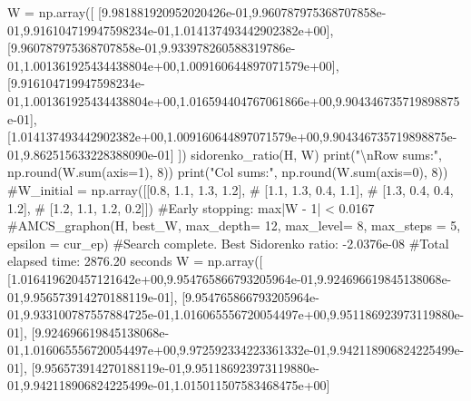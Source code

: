 \documentclass[
  letterpaper,
  DIV=11,
  numbers=noendperiod]{scrartcl}
\newenvironment{Shaded}{\begin{snugshade}}{\end{snugshade}}
\newcommand{\BuiltInTok}[1]{\textcolor[rgb]{0.00,0.23,0.31}{#1}}
\newcommand{\CharTok}[1]{\textcolor[rgb]{0.13,0.47,0.30}{#1}}
\newcommand{\CommentTok}[1]{\textcolor[rgb]{0.37,0.37,0.37}{#1}}
\newcommand{\DecValTok}[1]{\textcolor[rgb]{0.68,0.00,0.00}{#1}}
\newcommand{\FloatTok}[1]{\textcolor[rgb]{0.68,0.00,0.00}{#1}}
\newcommand{\NormalTok}[1]{\textcolor[rgb]{0.00,0.23,0.31}{#1}}
\newcommand{\OperatorTok}[1]{\textcolor[rgb]{0.37,0.37,0.37}{#1}}
\newcommand{\StringTok}[1]{\textcolor[rgb]{0.13,0.47,0.30}{#1}}
\begin{document}
\begin{Shaded}
\begin{Highlighting}[]
\NormalTok{W }\OperatorTok{=}\NormalTok{ np.array([}
\NormalTok{  [}\FloatTok{9.981881920952020426e{-}01}\NormalTok{,}\FloatTok{9.960787975368707858e{-}01}\NormalTok{,}\FloatTok{9.916104719947598234e{-}01}\NormalTok{,}\FloatTok{1.014137493442902382e+00}\NormalTok{],}
\NormalTok{[}\FloatTok{9.960787975368707858e{-}01}\NormalTok{,}\FloatTok{9.933978260588319786e{-}01}\NormalTok{,}\FloatTok{1.001361925434438804e+00}\NormalTok{,}\FloatTok{1.009160644897071579e+00}\NormalTok{],}
\NormalTok{[}\FloatTok{9.916104719947598234e{-}01}\NormalTok{,}\FloatTok{1.001361925434438804e+00}\NormalTok{,}\FloatTok{1.016594404767061866e+00}\NormalTok{,}\FloatTok{9.904346735719898875e{-}01}\NormalTok{],}
\NormalTok{[}\FloatTok{1.014137493442902382e+00}\NormalTok{,}\FloatTok{1.009160644897071579e+00}\NormalTok{,}\FloatTok{9.904346735719898875e{-}01}\NormalTok{,}\FloatTok{9.862515633228388090e{-}01}\NormalTok{]}
\NormalTok{])}
\NormalTok{sidorenko\_ratio(H, W)}
\BuiltInTok{print}\NormalTok{(}\StringTok{"}\CharTok{\textbackslash{}n}\StringTok{Row sums:"}\NormalTok{, np.}\BuiltInTok{round}\NormalTok{(W.}\BuiltInTok{sum}\NormalTok{(axis}\OperatorTok{=}\DecValTok{1}\NormalTok{), }\DecValTok{8}\NormalTok{))}
\BuiltInTok{print}\NormalTok{(}\StringTok{"Col sums:"}\NormalTok{, np.}\BuiltInTok{round}\NormalTok{(W.}\BuiltInTok{sum}\NormalTok{(axis}\OperatorTok{=}\DecValTok{0}\NormalTok{), }\DecValTok{8}\NormalTok{))}
\CommentTok{\#W\_initial = np.array([[0.8, 1.1, 1.3, 1.2],}
   \CommentTok{\# [1.1, 1.3, 0.4, 1.1],}
  \CommentTok{\#  [1.3, 0.4, 0.4, 1.2],}
  \CommentTok{\#  [1.2, 1.1, 1.2, 0.2]])}
\CommentTok{\#Early stopping: max|W {-} 1| \textless{} 0.0167}
\CommentTok{\#AMCS\_graphon(H, best\_W, max\_depth= 12, max\_level= 8, max\_steps = 5, epsilon = cur\_ep)}
\CommentTok{\#Search complete. Best Sidorenko ratio: {-}2.0376e{-}08}
\CommentTok{\#Total elapsed time: 2876.20 seconds}
\NormalTok{W }\OperatorTok{=}\NormalTok{ np.array([}
\NormalTok{  [}\FloatTok{1.016419620457121642e+00}\NormalTok{,}\FloatTok{9.954765866793205964e{-}01}\NormalTok{,}\FloatTok{9.924696619845138068e{-}01}\NormalTok{,}\FloatTok{9.956573914270188119e{-}01}\NormalTok{],}
\NormalTok{[}\FloatTok{9.954765866793205964e{-}01}\NormalTok{,}\FloatTok{9.933100787557884725e{-}01}\NormalTok{,}\FloatTok{1.016065556720054497e+00}\NormalTok{,}\FloatTok{9.951186923973119880e{-}01}\NormalTok{],}
\NormalTok{[}\FloatTok{9.924696619845138068e{-}01}\NormalTok{,}\FloatTok{1.016065556720054497e+00}\NormalTok{,}\FloatTok{9.972592334223361332e{-}01}\NormalTok{,}\FloatTok{9.942118906824225499e{-}01}\NormalTok{],}
\NormalTok{[}\FloatTok{9.956573914270188119e{-}01}\NormalTok{,}\FloatTok{9.951186923973119880e{-}01}\NormalTok{,}\FloatTok{9.942118906824225499e{-}01}\NormalTok{,}\FloatTok{1.015011507583468475e+00}\NormalTok{]}

\end{Highlighting}
\end{Shaded}
\end{document}
